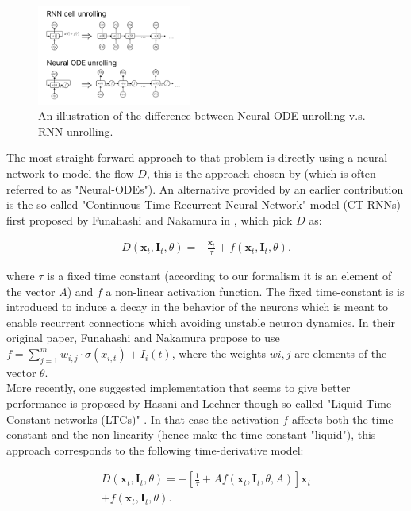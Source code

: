 \begin{figure}[h!]
    \centering
    \includegraphics[width=0.45\textwidth]{figures/unroll.pdf}
    \caption{An illustration of the difference between Neural ODE unrolling v.s. RNN unrolling.}
\end{figure}

 The most straight forward approach to that problem is directly using a neural network to model the flow $D$, this is the approach chosen by \cite{Chen2018NeuralOD} (which is often referred to as "Neural-ODEs"). An alternative provided by an earlier contribution is the so called "Continuous-Time Recurrent Neural Network" model (CT-RNNs) first proposed by Funahashi and Nakamura in \cite{Funahashi1993ApproximationOD}, which pick $D$ as: 
 
\begin{align}
    D(\bm{x}_t, \bm{I}_t, \theta) = -\frac{\bm{x}_t}{\tau} + f(\bm{x}_t, \bm{I}_t, \theta).
\end{align}

where $\tau$ is a fixed time constant (according to our formalism it is an element of the vector $A$) and $f$ a non-linear activation function. The fixed time-constant is is introduced to induce a decay in the behavior of the neurons which is meant to enable recurrent connections which avoiding unstable neuron dynamics. In their original paper, Funahashi and Nakamura propose to use $f = \sum_{j=1}^m w_{i,j} \cdot \sigma\left( x_{i,t} \right) + I_i (t)$, where the weights $w{i,j}$ are elements of the vector $\theta$. \\

More recently, one suggested implementation that seems to give better performance is proposed by Hasani and Lechner though so-called "Liquid Time-Constant networks (LTCs)" \cite{Hasani2021LiquidTN}. In that case the activation $f$ affects both the time-constant and the non-linearity (hence make the time-constant "liquid"), this approach corresponds to the following time-derivative model:

\begin{align}
    D(\bm{x}_t, \bm{I}_t, \theta) = - \left[ \frac{1}{\tau} + A f(\bm{x}_t, \bm{I}_t, \theta, A) \right] \bm{x}_t \nonumber \\ + f(\bm{x}_t, \bm{I}_t, \theta).
\end{align}

